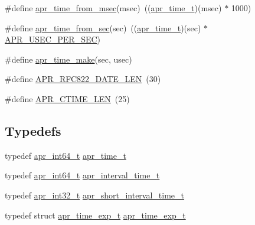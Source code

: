 \begin{DoxyCompactItemize}
\#define \hyperlink{group__apr__time_ga9530ae08ce10e2d653f4e7dc8b14ad00}{apr\+\_\+time\+\_\+from\+\_\+msec}(msec)~((\hyperlink{group__apr__time_gadb4bde16055748190eae190c55aa02bb}{apr\+\_\+time\+\_\+t})(msec) $\ast$ 1000)
\item 
\#define \hyperlink{group__apr__time_gaec56c2c03299a750006bfcc08d64ec32}{apr\+\_\+time\+\_\+from\+\_\+sec}(sec)~((\hyperlink{group__apr__time_gadb4bde16055748190eae190c55aa02bb}{apr\+\_\+time\+\_\+t})(sec) $\ast$ \hyperlink{group__apr__time_gab4dd3f3015d25a50f3be3e0e91043abf}{A\+P\+R\+\_\+\+U\+S\+E\+C\+\_\+\+P\+E\+R\+\_\+\+S\+EC})
\item 
\#define \hyperlink{group__apr__time_ga47e8d04826e56b6ce39ed082d33abc38}{apr\+\_\+time\+\_\+make}(sec,  usec)
\item 
\#define \hyperlink{group__apr__time_ga33933cf7a3e3c2cf6082c5f6d22ca3e5}{A\+P\+R\+\_\+\+R\+F\+C822\+\_\+\+D\+A\+T\+E\+\_\+\+L\+EN}~(30)
\item 
\#define \hyperlink{group__apr__time_ga0bd804145d3954f45a6962e9dd10f220}{A\+P\+R\+\_\+\+C\+T\+I\+M\+E\+\_\+\+L\+EN}~(25)
\end{DoxyCompactItemize}
\subsection*{Typedefs}
\begin{DoxyCompactItemize}
\item 
typedef \hyperlink{group__apr__platform_ga4b75afbf973dc6c8aea4ae75b044aa08}{apr\+\_\+int64\+\_\+t} \hyperlink{group__apr__time_gadb4bde16055748190eae190c55aa02bb}{apr\+\_\+time\+\_\+t}
\item 
typedef \hyperlink{group__apr__platform_ga4b75afbf973dc6c8aea4ae75b044aa08}{apr\+\_\+int64\+\_\+t} \hyperlink{group__apr__time_gaae2129185a395cc393f76fabf4f43e47}{apr\+\_\+interval\+\_\+time\+\_\+t}
\item 
typedef \hyperlink{group__apr__platform_ga21ef1e35fd3ff9be386f3cb20164ff02}{apr\+\_\+int32\+\_\+t} \hyperlink{group__apr__time_ga3e4663cc0d8b730902ff697c8d3f64be}{apr\+\_\+short\+\_\+interval\+\_\+time\+\_\+t}
\item 
typedef struct \hyperlink{structapr__time__exp__t}{apr\+\_\+time\+\_\+exp\+\_\+t} \hyperlink{group__apr__time_gae28f2767111a534f263ced95a28489b1}{apr\+\_\+time\+\_\+exp\+\_\+t}
\end{DoxyCompactItemize}
